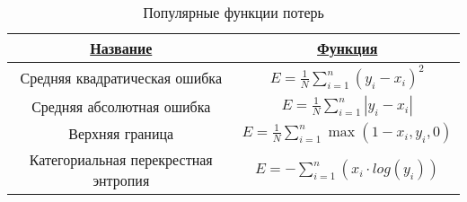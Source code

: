 \begin{table}[H]
  \centering
  \caption{Популярные функции потерь} \label{loss_funcs}
  \begin{tabular}{|c|c|}
    \hline    
    \hyperlink{name}{Название} & \hyperlink{func}{Функция}\\
    \hline
    Средняя квадратическая ошибка & $E=\frac{1}{N}\displaystyle\sum\limits_{i=1}^{n}(y_i - x_i)^2$\\
    \hline
    Средняя абсолютная ошибка & $E=\frac{1}{N}\displaystyle\sum\limits_{i=1}^{n}|y_i - x_i|$ \\
    \hline
    Верхняя граница & $E=\frac{1}{N}\displaystyle\sum\limits_{i=1}^{n}\max(1-x_i, y_i, 0)$ \\
    \hline
    Категориальная перекрестная энтропия & $E=-\displaystyle\sum\limits_{i=1}^{n}(x_i \cdot log(y_i))$ \\
    \hline
  \end{tabular}
\end{table}